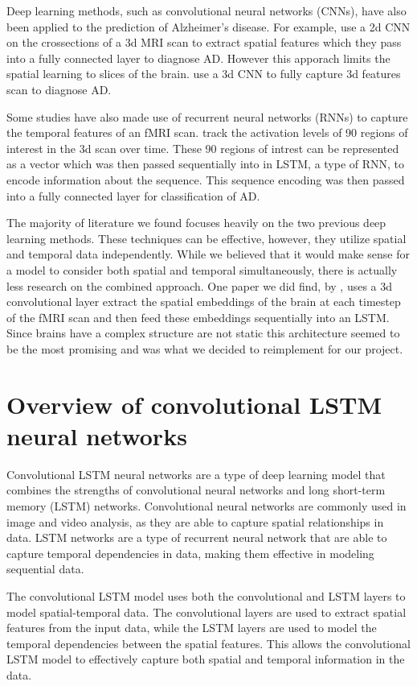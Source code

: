 \documentclass[10pt]{article}
\begin{document}
	Deep learning methods, such as convolutional neural networks (CNNs), have also been applied to the prediction of Alzheimer's disease. For example, \cite{2d-CNN} use a 2d CNN on the crossections of a 3d MRI scan to extract spatial features which they pass into a fully connected layer to diagnose AD. However this apporach limits the spatial learning to slices of the brain. \cite{3d-CNN} use a 3d CNN to fully capture 3d features scan to diagnose AD.  
	
	Some studies have also made use of recurrent neural networks (RNNs) to capture the temporal features of an fMRI scan. \cite{LSTM} track the activation levels of 90 regions of interest in the 3d scan over time. These 90 regions of intrest can be represented as a vector which was then passed sequentially into in LSTM, a type of RNN, to encode information about the sequence. This sequence encoding was then passed into a fully connected layer for classification of AD.  

	The majority of literature we found focuses heavily on the two previous deep learning methods. These techniques can be effective, however, they utilize spatial and temporal data independently. While we believed that it would make sense for a model to consider both spatial and temporal simultaneously, there is actually less research on the combined approach. One paper we did find, by \cite{Conv-LSTM}, uses a 3d convolutional layer extract the spatial embeddings of the brain at each timestep of the fMRI scan and then feed these embeddings sequentially into an LSTM. Since brains have a complex structure are not static this architecture seemed to be the most promising and was what we decided to reimplement for our project.
	
	\section{Overview of convolutional LSTM neural networks}

	Convolutional LSTM neural networks are a type of deep learning model that combines the strengths of convolutional neural networks and long short-term memory (LSTM) networks. Convolutional neural networks are commonly used in image and video analysis, as they are able to capture spatial relationships in data. LSTM networks are a type of recurrent neural network that are able to capture temporal dependencies in data, making them effective in modeling sequential data.

	The convolutional LSTM model uses both the convolutional and LSTM layers to model spatial-temporal data. The convolutional layers are used to extract spatial features from the input data, while the LSTM layers are used to model the temporal dependencies between the spatial features. This allows the convolutional LSTM model to effectively capture both spatial and temporal information in the data.
\end{document}
